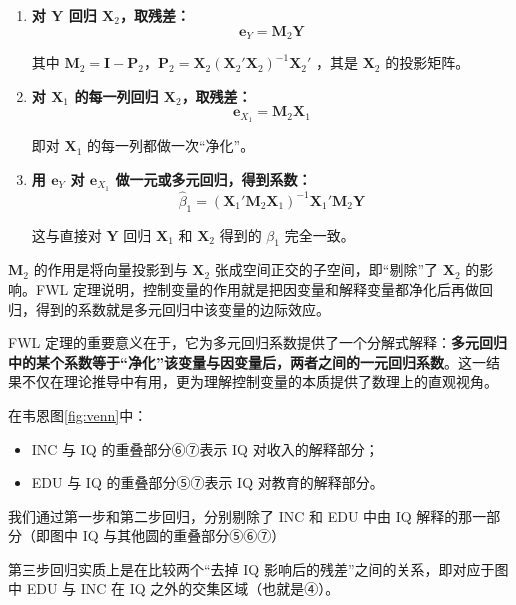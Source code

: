 \begin{enumerate}
	\item \textbf{对 $\mathbf{Y}$ 回归 $\mathbf{X}_2$，取残差：}
	\begin{equation}
	\mathbf{e}_Y = \mathbf{M}_2 \mathbf{Y}
	\end{equation}

	其中 $\mathbf{M}_2 = \mathbf{I} - \mathbf{P}_2$，$\mathbf{P}_2 = \mathbf{X}_2(\mathbf{X}_2'\mathbf{X}_2)^{-1}\mathbf{X}_2'$ ，其是 $\mathbf{X}_2$ 的投影矩阵。
	\item \textbf{对 $\mathbf{X}_1$ 的每一列回归 $\mathbf{X}_2$，取残差：}
	\begin{equation}
	\mathbf{e}_{X_1} = \mathbf{M}_2 \mathbf{X}_1
	\end{equation}
	
	即对 $\mathbf{X}_1$ 的每一列都做一次“净化”。
	\item \textbf{用 $\mathbf{e}_Y$ 对 $\mathbf{e}_{X_1}$ 做一元或多元回归，得到系数：}
	\begin{equation}
	\hat{\beta}_1 = \left( \mathbf{X}_1'\mathbf{M}_2\mathbf{X}_1 \right)^{-1} \mathbf{X}_1'\mathbf{M}_2\mathbf{Y}
	\end{equation}

	这与直接对 $\mathbf{Y}$ 回归 $\mathbf{X}_1$ 和 $\mathbf{X}_2$ 得到的 $\beta_1$ 完全一致。
\end{enumerate}

$\mathbf{M}_2$ 的作用是将向量投影到与 $\mathbf{X}_2$ 张成空间正交的子空间，即“剔除”了 $\mathbf{X}_2$ 的影响。FWL 定理说明，控制变量的作用就是把因变量和解释变量都净化后再做回归，得到的系数就是多元回归中该变量的边际效应。

FWL 定理的重要意义在于，它为多元回归系数提供了一个分解式解释：\textbf{多元回归中的某个系数等于“净化”该变量与因变量后，两者之间的一元回归系数}。这一结果不仅在理论推导中有用，更为理解控制变量的本质提供了数理上的直观视角。

在韦恩图\ref{fig:venn}中：
\begin{itemize}
    \item INC 与 IQ 的重叠部分⑥⑦表示 IQ 对收入的解释部分；
    \item EDU 与 IQ 的重叠部分⑤⑦表示 IQ 对教育的解释部分。
\end{itemize}

我们通过第一步和第二步回归，分别剔除了 INC 和 EDU 中由 IQ 解释的那一部分（即图中 IQ 与其他圆的重叠部分⑤⑥⑦）

第三步回归实质上是在比较两个“去掉 IQ 影响后的残差”之间的关系，即对应于图中 EDU 与 INC 在 IQ 之外的交集区域（也就是④）。

